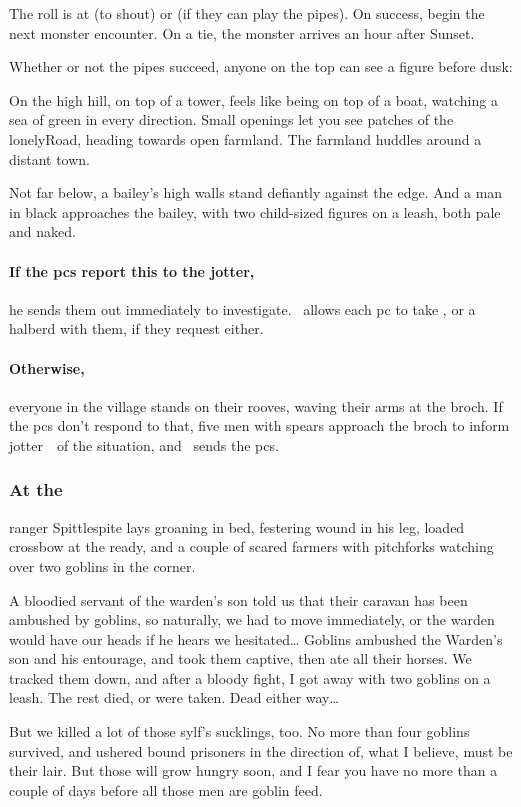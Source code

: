 \documentclass[10pt,twoside]{book}
\begin{document}
The roll is  at \tn[12] (to shout) or \tn[9] (if they can play the pipes).
On success, begin the next \gls{monster} encounter.
On a tie, the \gls{monster} arrives an hour after Sunset.

Whether or not the pipes succeed, anyone on the top can see a figure before dusk:

\begin{boxtext}
  On the high hill, on top of a tower, feels like being on top of a boat, watching a  sea of green in every direction.
  Small openings let you see patches of the \gls{lonelyRoad}, heading towards open farmland.
  The farmland huddles around a distant town.
  
  Not far below, a bailey's high walls stand defiantly against the \gls{edge}.
  And a man in black approaches the bailey, with two child-sized figures on a leash, both pale and naked.
\end{boxtext}

\paragraph{If the \glspl{pc} report this to the \gls{jotter},}
he sends them out immediately to investigate.
\fjot\ allows each \gls{pc} to take \rations, or a halberd with them, if they request either.

\paragraph{Otherwise,}
everyone in the \gls{village} stands on their rooves, waving their arms at the \gls{broch}.
If the \glspl{pc} don't respond to that, five men with spears approach the \gls{broch} to inform \Gls{jotter}~\fjot\ of the situation, and \fjot\ sends the \glspl{pc}.

\subsubsection{At the }
\gls{ranger} Spittlespite lays groaning in bed, festering wound in his leg, loaded crossbow at the ready, and a couple of scared farmers with pitchforks watching over two goblins in the corner.

\begin{speechtext}
  A bloodied servant of the \gls{warden}'s son told us that their caravan has been ambushed by goblins, so naturally, we had to move immediately, or the warden would have our heads if he hears we hesitated\ldots
  Goblins ambushed the Warden's son and his entourage, and took them captive, then ate all their horses.
  We tracked them down, and after a bloody fight, I got away with two goblins on a leash.
  The rest died, or were taken.
  Dead either way\ldots

  But we killed a lot of those \gls{sylf}'s sucklings, too.
  No more than four goblins survived, and ushered bound prisoners in the direction of, what I believe, must be their lair.
  But those will grow hungry soon, and I fear you have no more than a couple of days before all those men are goblin feed.
\end{speechtext}
\end{document}
